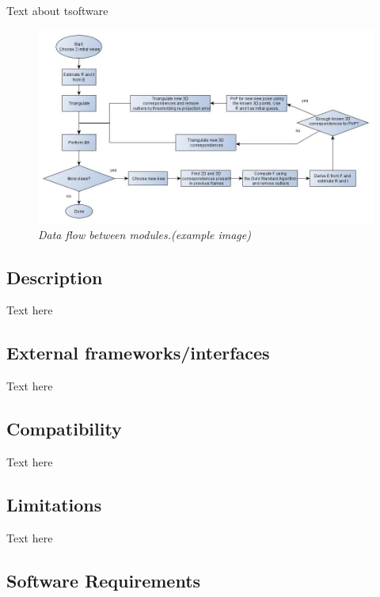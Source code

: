Text about tsoftware

\begin{figure}[htb]
	\centering
	\includegraphics[width=160mm]{images/example1.jpg}
	\caption[This text ends up at the list of figures]{\textit{Data flow between modules.(example image)}}
	\label{fig:block_overview_fig}  %
\end{figure}



\subsection{Description}
Text here

\subsection{External frameworks/interfaces}
Text here

\subsection{Compatibility}
Text here

\subsection{Limitations}
Text here

\subsection{Software Requirements}
\label{sec:hardware_req}
\reqtable
{	
}